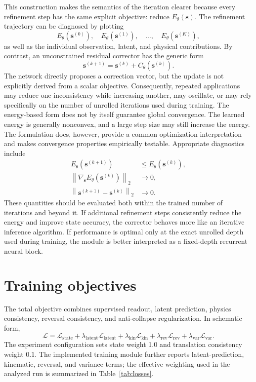 \documentclass[11pt,a4paper]{article}
\begin{document}
This construction makes the semantics of the iteration clearer because every refinement step has the same explicit objective: reduce $E_\theta(\mathbf s)$. The refinement trajectory can be diagnosed by plotting 
\begin{equation} 
	E_\theta(\mathbf s^{(0)}), \quad E_\theta(\mathbf s^{(1)}), \quad \ldots, \quad E_\theta(\mathbf s^{(K)}), 
\end{equation} 
as well as the individual observation, latent, and physical contributions. By contrast, an unconstrained residual corrector has the generic form 
\begin{equation} 
	\mathbf s^{(k+1)} = \mathbf s^{(k)} + C_\theta(\mathbf s^{(k)}). \label{eq:unconstrained-corrector} 
\end{equation} 
The network directly proposes a correction vector, but the update is not explicitly derived from a scalar objective. Consequently, repeated applications may reduce one inconsistency while increasing another, may oscillate, or may rely specifically on the number of unrolled iterations used during training. The energy-based form does not by itself guarantee global convergence. The learned energy is generally nonconvex, and a large step size may still increase the energy. The formulation does, however, provide a common optimization interpretation and makes convergence properties empirically testable. Appropriate diagnostics include 
\begin{align} 
	E_\theta(\mathbf s^{(k+1)}) &\leq E_\theta(\mathbf s^{(k)}), \\ \left\| \nabla_{\mathbf s} E_\theta(\mathbf s^{(k)}) \right\|_2 &\longrightarrow 0, \\ 
	\left\| \mathbf s^{(k+1)}-\mathbf s^{(k)} \right\|_2 &\longrightarrow 0. 
\end{align} 
These quantities should be evaluated both within the trained number of iterations and beyond it. If additional refinement steps consistently reduce the energy and improve state accuracy, the corrector behaves more like an iterative inference algorithm. If performance is optimal only at the exact unrolled depth used during training, the module is better interpreted as a fixed-depth recurrent neural block.

\section{Training objectives}
The total objective combines supervised readout, latent prediction, physics consistency, reversal consistency, and anti-collapse regularization. In schematic form,
\begin{equation}
\mathcal L=\mathcal L_{\mathrm{state}}+
\lambda_{\mathrm{latent}}\mathcal L_{\mathrm{latent}}+
\lambda_{\mathrm{kin}}\mathcal L_{\mathrm{kin}}+
\lambda_{\mathrm{rev}}\mathcal L_{\mathrm{rev}}+
\lambda_{\mathrm{var}}\mathcal L_{\mathrm{var}}.
\end{equation}
The experiment configuration sets state weight 1.0 and translation consistency weight 0.1. The implemented training module further reports latent-prediction, kinematic, reversal, and variance terms; the effective weighting used in the analyzed run is summarized in Table~\ref{tab:losses}.
\end{document}
